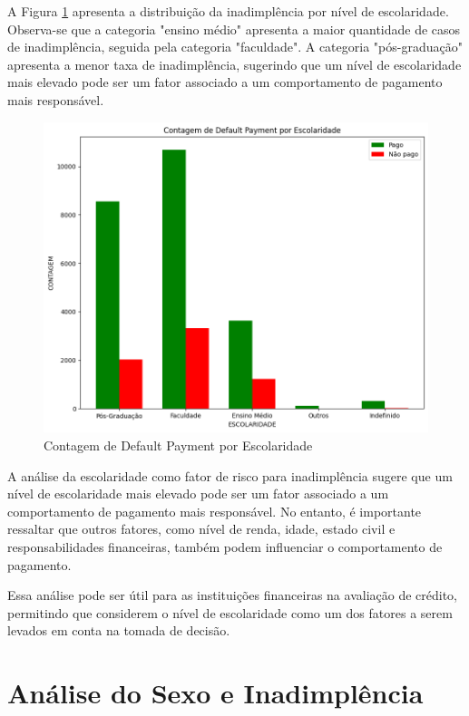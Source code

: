 \documentclass{abntpuc}
\begin{document}
A Figura \ref{fig:grafico3} apresenta a distribuição da inadimplência por nível de escolaridade. Observa-se que a categoria "ensino médio" apresenta a maior quantidade de casos de inadimplência, seguida pela categoria "faculdade". A categoria "pós-graduação" apresenta a menor taxa de inadimplência, sugerindo que um nível de escolaridade mais elevado pode ser um fator associado a um comportamento de pagamento mais responsável.

\begin{figure}[H]
    \centering
    \includegraphics[width=\textwidth]{grafico3.png}
    \caption{Contagem de Default Payment por Escolaridade}
    \label{fig:grafico3}
\end{figure}

A análise da escolaridade como fator de risco para inadimplência sugere que um nível de escolaridade mais elevado pode ser um fator associado a um comportamento de pagamento mais responsável. No entanto, é importante ressaltar que outros fatores, como nível de renda, idade, estado civil e responsabilidades financeiras, também podem influenciar o comportamento de pagamento.

Essa análise pode ser útil para as instituições financeiras na avaliação de crédito, permitindo que considerem o nível de escolaridade como um dos fatores a serem levados em conta na tomada de decisão.

\section{Análise do Sexo e Inadimplência}
\end{document}
